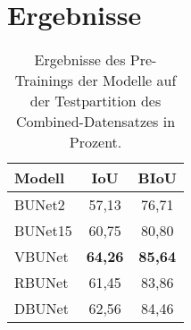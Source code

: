 \chapter{Ergebnisse} \label{sec:results}

\begin{table}[ht]
	\centering
	\begin{tabular}{l|c|c}
		Modell & \ac{IoU} & \ac{BIoU} \\
		\midrule
        BUNet2 & 57,13 & 76,71 \\ 
        BUNet15 & 60,75 & 80,80 \\ 
        VBUNet & \textbf{64,26} & \textbf{85,64} \\ 
        RBUNet & 61,45 & 83,86 \\ 
        DBUNet & 62,56 & 84,46 \\ 
        
	\end{tabular}
	\caption{Ergebnisse des Pre-Trainings der Modelle auf der Testpartition des Combined-Datensatzes in Prozent.}
	\label{tab:results-roads}
\end{table}

